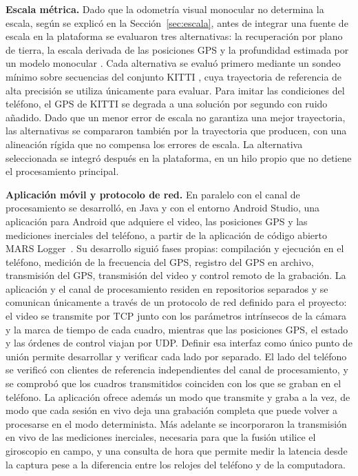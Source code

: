 \textbf{Escala métrica.}
Dado que la odometría visual monocular no determina la escala, según se explicó en la Sección~\ref{sec:escala}, antes de integrar una fuente de escala en la plataforma se evaluaron tres alternativas: la recuperación por plano de tierra, la escala derivada de las posiciones GPS y la profundidad estimada por un modelo monocular \cite{yang2024depthanything}.
Cada alternativa se evaluó primero mediante un sondeo mínimo sobre secuencias del conjunto KITTI \cite{geiger2012kitti}, cuya trayectoria de referencia de alta precisión se utiliza únicamente para evaluar.
Para imitar las condiciones del teléfono, el GPS de KITTI se degrada a una solución por segundo con ruido añadido.
Dado que un menor error de escala no garantiza una mejor trayectoria, las alternativas se compararon también por la trayectoria que producen, con una alineación rígida que no compensa los errores de escala.
La alternativa seleccionada se integró después en la plataforma, en un hilo propio que no detiene el procesamiento principal.

\textbf{Aplicación móvil y protocolo de red.}
En paralelo con el canal de procesamiento se desarrolló, en Java y con el entorno Android Studio, una aplicación para Android que adquiere el video, las posiciones GPS y las mediciones inerciales del teléfono, a partir de la aplicación de código abierto MARS Logger~\cite{huai2019mars}.
Su desarrollo siguió fases propias: compilación y ejecución en el teléfono, medición de la frecuencia del GPS, registro del GPS en archivo, transmisión del GPS, transmisión del video y control remoto de la grabación.
La aplicación y el canal de procesamiento residen en repositorios separados y se comunican únicamente a través de un protocolo de red definido para el proyecto: el video se transmite por TCP junto con los parámetros intrínsecos de la cámara y la marca de tiempo de cada cuadro, mientras que las posiciones GPS, el estado y las órdenes de control viajan por UDP.
Definir esa interfaz como único punto de unión permite desarrollar y verificar cada lado por separado.
El lado del teléfono se verificó con clientes de referencia independientes del canal de procesamiento, y se comprobó que los cuadros transmitidos coinciden con los que se graban en el teléfono.
La aplicación ofrece además un modo que transmite y graba a la vez, de modo que cada sesión en vivo deja una grabación completa que puede volver a procesarse en el modo determinista.
Más adelante se incorporaron la transmisión en vivo de las mediciones inerciales, necesaria para que la fusión utilice el giroscopio en campo, y una consulta de hora que permite medir la latencia desde la captura pese a la diferencia entre los relojes del teléfono y de la computadora.

